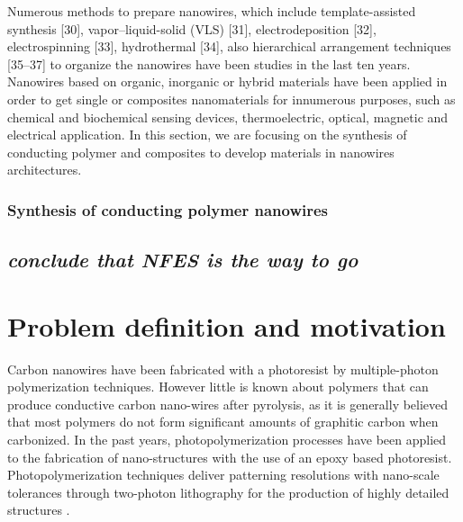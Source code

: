 Numerous methods to prepare nanowires, which include template-assisted synthesis [30], vapor–liquid-solid (VLS) [31], electrodeposition [32], electrospinning [33], hydrothermal [34], also hierarchical arrangement techniques [35–37] to organize the nanowires have been studies in the last ten years. Nanowires based on organic, inorganic or hybrid materials have been applied in order to get single or composites nanomaterials for innumerous purposes, such as chemical and biochemical sensing devices, thermoelectric, optical, magnetic and electrical application. In this section, we are focusing on the synthesis of conducting polymer and composites to develop materials in nanowires architectures.

\subsubsection{Synthesis of conducting polymer nanowires}



\subsection{\emph{conclude that NFES is the way to go}}




\section{Problem definition and motivation}


Carbon nanowires have been fabricated with a photoresist by multiple-photon polymerization techniques. However little is known about polymers that can produce conductive carbon nano-wires after pyrolysis, as it is generally believed that most polymers do not form significant amounts of graphitic carbon when carbonized.
In the past years, photopolymerization processes have been applied to the fabrication of nano-structures with the use of an epoxy based photoresist. \cite{Boer2014} Photopolymerization techniques deliver patterning resolutions with nano-scale tolerances through two-photon lithography for the production of highly detailed structures \cite{Hribar2014}.


